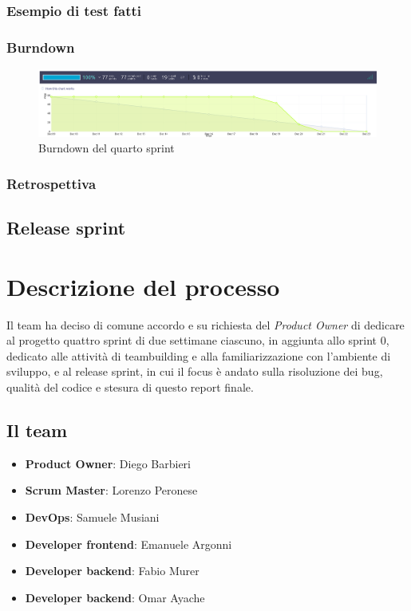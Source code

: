 \documentclass{article}
\begin{document}
\subsubsection{Esempio di test fatti}

\subsubsection{Burndown}
\begin{figure}[H]
    \centering
    \includegraphics[width=1\textwidth]{burndown4}
    \caption{Burndown del quarto sprint}
    \label{fig:burndown4}
\end{figure}

\subsubsection{Retrospettiva}

\subsection{Release sprint}

\section{Descrizione del processo}

Il team ha deciso di comune accordo e su richiesta del \textit{Product Owner} di dedicare al progetto quattro sprint di due settimane 
ciascuno, in aggiunta allo sprint 0, dedicato alle attività di teambuilding e alla familiarizzazione con l'ambiente di sviluppo, e 
al release sprint, in cui il focus è andato sulla risoluzione dei bug, qualità del codice e stesura di questo report finale.

\subsection{Il team}

\begin{itemize}
    \item \textbf{Product Owner}: Diego Barbieri
    \item \textbf{Scrum Master}: Lorenzo Peronese
    \item \textbf{DevOps}: Samuele Musiani
    \item \textbf{Developer frontend}: Emanuele Argonni
    \item \textbf{Developer backend}: Fabio Murer
    \item \textbf{Developer backend}: Omar Ayache
\end{itemize}
\end{document}
